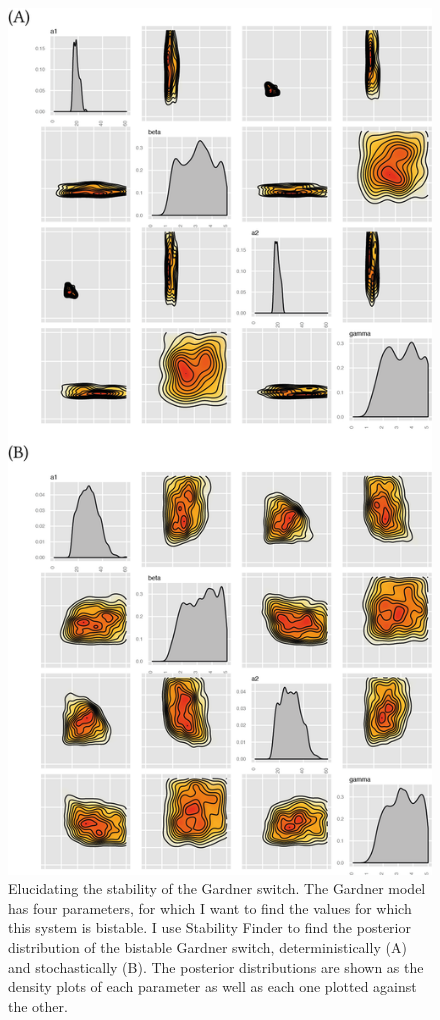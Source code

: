 \begin{figure}[htbp]
\begin{center}
	\includegraphics[scale=0.8]{../../chapters/chapterStabilityFinder/images/gardner_posteriors.png}
	\caption[LoF caption]{\label{fig:gard_post} Elucidating the stability of the Gardner switch. The Gardner model has four parameters, for which I want to find the values for which this system is bistable. I use Stability Finder to find the posterior distribution of the bistable Gardner switch, deterministically (A) and stochastically (B). The posterior distributions are shown as the density plots of each parameter as well as each one plotted against the other.  }
\end{center}
\end{figure}
